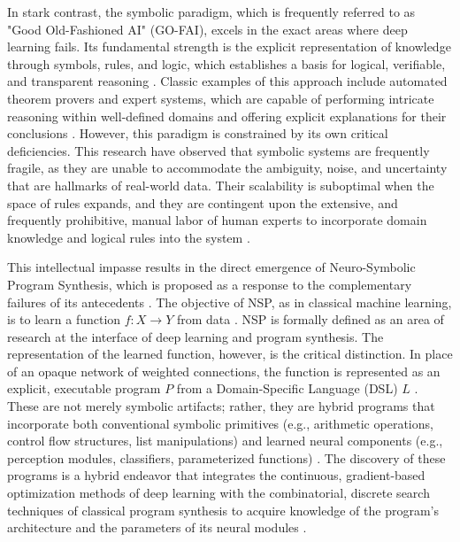 \documentclass[12pt, a4paper]{report}
\begin{document}
In stark contrast, the symbolic paradigm, which is frequently referred to as "Good Old-Fashioned AI" (GO-FAI), excels in the exact areas where deep learning fails. Its fundamental strength is the explicit representation of knowledge through symbols, rules, and logic, which establishes a basis for logical, verifiable, and transparent reasoning \citep{calegari2020design}. Classic examples of this approach include automated theorem provers and expert systems, which are capable of performing intricate reasoning within well-defined domains and offering explicit explanations for their conclusions \citep{manna1980deductive}. However, this paradigm is constrained by its own critical deficiencies. This research \citep{chaudhuri2021neurosymbolic} have observed that symbolic systems are frequently fragile, as they are unable to accommodate the ambiguity, noise, and uncertainty that are hallmarks of real-world data. Their scalability is suboptimal when the space of rules expands, and they are contingent upon the extensive, and frequently prohibitive, manual labor of human experts to incorporate domain knowledge and logical rules into the system \citep{manna1980deductive}.

This intellectual impasse results in the direct emergence of Neuro-Symbolic Program Synthesis, which is proposed as a response to the complementary failures of its antecedents \citep{gulwani2017program}. The objective of NSP, as in classical machine learning, is to learn a function $f: X \rightarrow Y$ from data \citep{bommasani2021opportunities}. NSP is formally defined as an area of research at the interface of deep learning and program synthesis. The representation of the learned function, however, is the critical distinction. In place of an opaque network of weighted connections, the function is represented as an explicit, executable program $P$ from a Domain-Specific Language (DSL) $L$ \citep{gulwani2017program}. These are not merely symbolic artifacts; rather, they are hybrid programs that incorporate both conventional symbolic primitives (e.g., arithmetic operations, control flow structures, list manipulations) and learned neural components (e.g., perception modules, classifiers, parameterized functions) \citep{lample2019deep}. The discovery of these programs is a hybrid endeavor that integrates the continuous, gradient-based optimization methods of deep learning with the combinatorial, discrete search techniques of classical program synthesis to acquire knowledge of the program's architecture and the parameters of its neural modules \citep{lample2019deep}.
\end{document}
